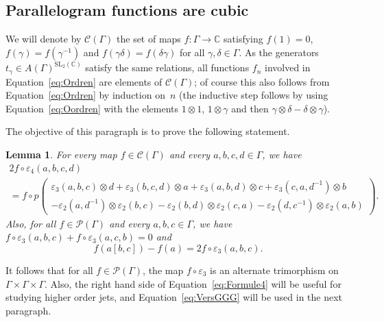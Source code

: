 \documentclass[11pt]{article}
\let\mathcal\mathscr
\newtheorem{lemma}[theorem]{Lemma}
\theoremstyle{definition}
\newcommand{\CC}{\mathbb{C}}
\newcommand{\SL}{\mathrm{SL}}
\begin{document}
\subsection{Parallelogram functions are cubic}\label{ssec:paralcubic}

We will denote by $\mathcal{C}(\Gamma)$ the set of maps $f:\Gamma\to \CC$
satisfying $f(1)=0$, $f(\gamma)=f(\gamma^{-1})$ and
$f(\gamma\delta)=f(\delta\gamma)$ for all $\gamma,\delta\in \Gamma$.
As the generators $t_{\gamma}\in A(\Gamma)^{\SL_2(\CC)}$ satisfy the same
relations, all functions $f_n$ involved in Equation~\eqref{eq:Ordren} are
elements of $\mathcal{C}(\Gamma)$; of course this also follows
from Equation~\eqref{eq:Ordren} by induction on~$n$
(the inductive step
follows by using Equation~\eqref{eq:Oordren} with the elements
$1\otimes 1$, $1\otimes\gamma$ and then
$\gamma\otimes\delta-\delta\otimes\gamma$).

The objective of this paragraph is to prove the following statement.
\begin{lemma}\label{lem:ParallCubiques}
For every map $f\in\mathcal{C}(\Gamma)$ and every $a,b,c,d\in\Gamma$,
we have
\begin{multline}\label{eq:Formule4}
2f\circ\varepsilon_4(a,b,c,d)\\
= f\circ p\left(\begin{array}{c}
\varepsilon_3(a,b,c)\otimes d+\varepsilon_3(b,c,d)\otimes a +
\varepsilon_3(a,b,d)\otimes c + \varepsilon_3(c,a,d^{-1})\otimes b \\
- \varepsilon_2(a,d^{-1})\otimes\varepsilon_2(b,c)-\varepsilon_2(b,d)
\otimes\varepsilon_2(c,a)-\varepsilon_2(d,c^{-1})\otimes\varepsilon_2(a,b)
\end{array}\right).
\end{multline}
Also, for all $f\in\mathcal{P}(\Gamma)$ and every $a,b,c\in\Gamma$, we
have $f\circ\varepsilon_3(a,b,c)+f\circ \varepsilon_3(a,c,b)=0$ and
\begin{equation}\label{eq:VersGGG}
f(a[b,c])-f(a)= 2f\circ \varepsilon_3(a,b,c).
\end{equation}
\end{lemma}
It follows that for all $f\in\mathcal{P}(\Gamma)$, the map
$f\circ\varepsilon_3$ is an alternate trimorphism on
$\Gamma\times\Gamma\times\Gamma$. Also, the right hand side of
Equation~\eqref{eq:Formule4} will be useful for studying higher order jets,
and Equation~\eqref{eq:VersGGG} will be used in the next paragraph.
\end{document}
